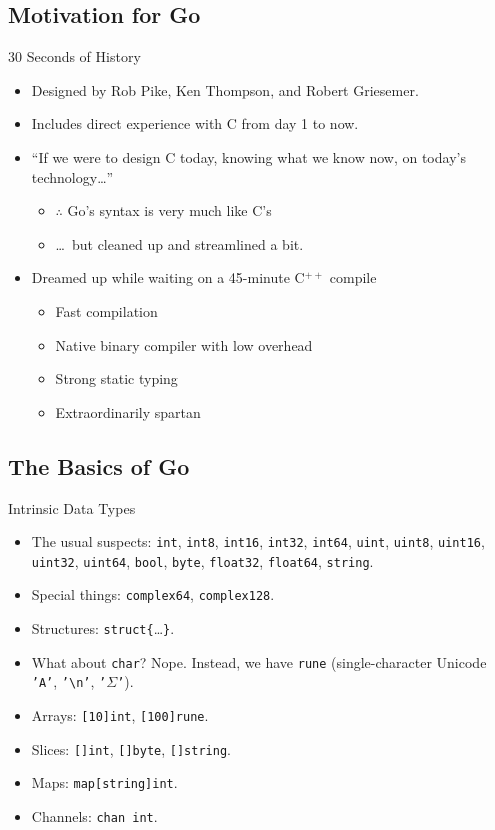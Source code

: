 \documentclass[pdf]{beamer}
\newcommand\z[1]{\texttt{#1}}
\newcommand\keyword[1]{{\color{blue}\z{#1}}}
\newcommand\gostring[1]{{\color{orange!90!black}\z{#1}}}
\begin{document}
\subsection{Motivation for Go}
\begin{frame}{30 Seconds of History}
	\begin{itemize}
		\item Designed by Rob Pike, Ken Thompson, and Robert Griesemer.
		\item Includes direct experience with C from day 1 to now.
			\pause
		\item ``If we were to design C today, knowing what we know now, on today's technology\dots''
			\pause
			\begin{itemize}
		\item $\therefore$ Go's syntax is very much like C's
		\item \dots\ but cleaned up and streamlined a bit.
			\end{itemize}
		\pause
	\item Dreamed up while waiting on a 45-minute C$^{++}$ compile
		\pause
			\begin{itemize}
				\item Fast compilation
				\item Native binary compiler with low overhead
				\item Strong static typing
				\item Extraordinarily spartan
			\end{itemize}
	\end{itemize}
\end{frame}
\subsection{The Basics of Go}
\begin{frame}{Intrinsic Data Types}
	\begin{itemize}
		\item The usual suspects: 
			\keyword{int}, 
			\keyword{int8}, 
			\keyword{int16}, 
			\keyword{int32}, 
			\keyword{int64}, 
			\keyword{uint}, 
			\keyword{uint8}, 
			\keyword{uint16}, 
			\keyword{uint32}, 
			\keyword{uint64}, 
			\keyword{bool},
			\keyword{byte},
			\keyword{float32},
			\keyword{float64},
			\keyword{string}.
			\pause
		\item Special things:
			\keyword{complex64},
			\keyword{complex128}.
			\pause
		\item Structures: \keyword{struct}\z{\{}\dots\z{\}}.
			\pause
		\item What about \keyword{char}? Nope. Instead, we have \keyword{rune} (single-character Unicode \gostring{'A'}, \gostring{'\textbackslash n'}, \gostring{'$\Sigma$'}).
			\pause
		\item Arrays: \z{[10]}\keyword{int}, \z{[100]}\keyword{rune}.
			\pause
		\item Slices: \z{[]}\keyword{int}, \z{[]}\keyword{byte}, \z{[]}\keyword{string}.
			\pause
		\item Maps: \keyword{map}\z{[}\keyword{string}\z{]}\keyword{int}.
			\pause
		\item Channels: \keyword{chan int}.
	\end{itemize}
\end{frame}
\end{document}
